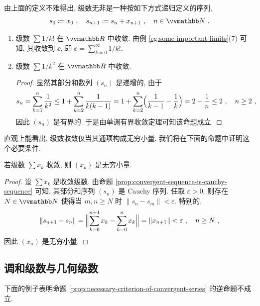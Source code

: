 由上面的定义不难得出, 级数无非是一种按如下方式递归定义的序列,
\[
    s_0 \coloneqq x_0\ ,\quad s_{n + 1} \coloneqq s_n + x_{n + 1}\ ,\quad n \in \N\ .
\]

\begin{example}\label{eg:some-simple-convergent-series}
    \begin{enumerate}
        \item 级数 \(\sum 1 / k!\) 在 \(\R\) 中收敛. 由例 \ref{eg:some-important-limits}(7) 可知, 其收敛到 \(\ee\), 即 \(\ee = \sum_{k = 0}^\infty 1 / k!\).
        \item 级数 \(\sum 1 / k^2\) 在 \(\R\) 中收敛.
        \begin{proof}
            显然其部分和数列 \((s_n)\) 是递增的, 由于
            \[
                s_n = \sum_{k = 1}^n \frac{1}{k^2} \leq 1 + \sum_{k = 2}^n \frac{1}{k (k - 1)} = 1 + \sum_{k = 2}^n \Bigl(\frac{1}{k - 1} - \frac{1}{k}\Bigr) = 2 - \frac{1}{n} \leq 2\ ,\quad n \geq 2\ ,
            \]
            因此 \((s_n)\) 是有界的. 于是由单调有界收敛定理可知该命题成立.
        \end{proof}
    \end{enumerate}
\end{example}

直观上能看出, 级数收敛仅当其通项构成无穷小量. 我们将在下面的命题中证明这个必要条件.

\begin{proposition}\label{prop:necessary-criterion-of-convergent-series}
    若级数 \(\sum x_k\) 收敛, 则 \((x_k)\) 是无穷小量.
\end{proposition}

\begin{proof}
    设 \(\sum x_k\) 是收敛级数. 由命题 \ref{prop:convergent-sequence-is-cauchy-sequence} 可知, 其部分和序列 \((s_n)\) 是 Cauchy 序列. 任取 \(\varepsilon > 0\). 则存在 \(N \in \N\) 使得当 \(m, n \geq N\) 时 \(\|s_n - s_m\| < \varepsilon\). 特别的,
    \[
        \|s_{n + 1} - s_n\| = \Bigl\|\sum_{k = 0}^{n + 1} x_k - \sum_{k = 0}^n x_k\Bigr\| = \|x_{n + 1}\| < \varepsilon\ ,\quad n \geq N\ ,
    \]
    因此 \((x_n)\) 是无穷小量.
\end{proof}

\subsection{调和级数与几何级数}

下面的例子表明命题 \ref{prop:necessary-criterion-of-convergent-series} 的逆命题不成立.

